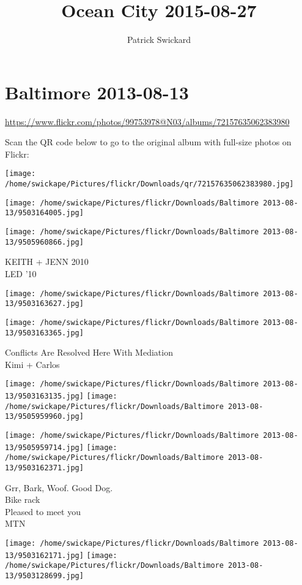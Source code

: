 \documentclass[10pt,letterpaper]{article}
\title{Ocean City 2015-08-27}
\author{Patrick Swickard}
\date{}
\begin{document}
\section*{Baltimore 2013-08-13}

\url{https://www.flickr.com/photos/99753978@N03/albums/72157635062383980}

Scan the QR code below to go to the original album with full-size photos on Flickr:

\texttt{[image: /home/swickape/Pictures/flickr/Downloads/qr/72157635062383980.jpg]}
\pagebreak

\texttt{[image: /home/swickape/Pictures/flickr/Downloads/Baltimore 2013-08-13/9503164005.jpg]}

\vspace{0.25in}
\texttt{[image: /home/swickape/Pictures/flickr/Downloads/Baltimore 2013-08-13/9505960866.jpg]}

KEITH + JENN 2010\\
LED '10
\pagebreak

\texttt{[image: /home/swickape/Pictures/flickr/Downloads/Baltimore 2013-08-13/9503163627.jpg]}

\vspace{0.25in}
\texttt{[image: /home/swickape/Pictures/flickr/Downloads/Baltimore 2013-08-13/9503163365.jpg]}

Conflicts Are Resolved Here With Mediation\\
Kimi + Carlos
\pagebreak

\texttt{[image: /home/swickape/Pictures/flickr/Downloads/Baltimore 2013-08-13/9503163135.jpg]}
\texttt{[image: /home/swickape/Pictures/flickr/Downloads/Baltimore 2013-08-13/9505959960.jpg]}

\texttt{[image: /home/swickape/Pictures/flickr/Downloads/Baltimore 2013-08-13/9505959714.jpg]}
\texttt{[image: /home/swickape/Pictures/flickr/Downloads/Baltimore 2013-08-13/9503162371.jpg]}

Grr, Bark, Woof.  Good Dog.\\
Bike rack\\
Pleased to meet you\\
MTN
\pagebreak

\texttt{[image: /home/swickape/Pictures/flickr/Downloads/Baltimore 2013-08-13/9503162171.jpg]}
\texttt{[image: /home/swickape/Pictures/flickr/Downloads/Baltimore 2013-08-13/9503128699.jpg]}
\end{document}
